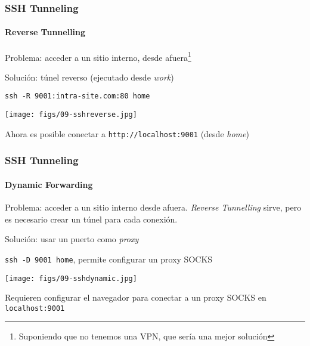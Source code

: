 \documentclass[letter]{beamer}
\begin{document}
\begin{frame}
  \frametitle{SSH Tunneling}
  \framesubtitle{Reverse Tunnelling}

  Problema: acceder a un sitio interno, desde afuera\footnote{Suponiendo que no tenemos una VPN, que sería una mejor solución}
  
  Solución: túnel reverso (ejecutado desde {\em work})
  \begin{center}
    {\tt ssh -R 9001:intra-site.com:80 home}
  
    \texttt{[image: figs/09-sshreverse.jpg]}
  \end{center}

   Ahora es posible conectar a {\tt http://localhost:9001} (desde {\em home})

\end{frame}
\begin{frame}
  \frametitle{SSH Tunneling}
  \framesubtitle{Dynamic Forwarding}

  Problema: acceder a un sitio interno desde afuera. {\em Reverse Tunnelling} sirve, pero es necesario
  crear un túnel para cada conexión.
  
  Solución: usar un puerto como {\em proxy}
  \begin{center}
    {\tt ssh -D 9001 home}, permite configurar un proxy SOCKS
  
    \texttt{[image: figs/09-sshdynamic.jpg]}
  \end{center}

   Requieren configurar el navegador para conectar a un proxy SOCKS en {\tt localhost:9001}

\end{frame}
\end{document}
